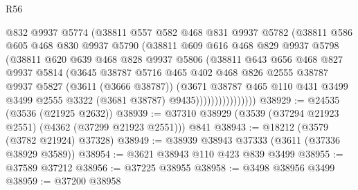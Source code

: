 \begin{lexlean}{R56}
\begin{coremodule}
                      @832
                      @9937
                      @5774
                      (@38811
                        @557
                        @582
                        @468
                        @831
                        @9937
                        @5782
                        (@38811
                          @586
                          @605
                          @468
                          @830
                          @9937
                          @5790
                          (@38811
                            @609
                            @616
                            @468
                            @829
                            @9937
                            @5798
                            (@38811
                              @620
                              @639
                              @468
                              @828
                              @9937
                              @5806
                              (@38811
                                @643
                                @656
                                @468
                                @827
                                @9937
                                @5814
                                (@3645
                                  @38787
                                  @5716
                                  @465
                                  @402
                                  @468
                                  @826
                                  @2555
                                  @38787
                                  @9937
                                  @5827
                                  (@3611 (@3666 @38787))
                                  (@3671
                                    @38787
                                    @465
                                    @110
                                    @431
                                    @3499
                                    @3499
                                    @2555
                                    @3322
                                    (@3681 @38787)
                                    @9435))))))))))))))))
@38929 := @24535 (@3536 (@21925 @2632))
@38939 := @37310 @38929 (@3539 (@37294 @21923 @2551) (@4362 (@37299 @21923 @2551))) @841
@38943 := @18212 (@3579 (@3782 @21924) @37328)
@38949 := @38939 @38943 @37333 (@3611 (@37336 @38929 @3589))
@38954 := @3621 @38943 @110 @423 @839 @3499
@38955 := @37589 @37212
@38956 := @37225 @38955
@38958 := @3498 @38956 @3499
@38959 := @37200 @38958

\end{coremodule}
\end{lexlean}
